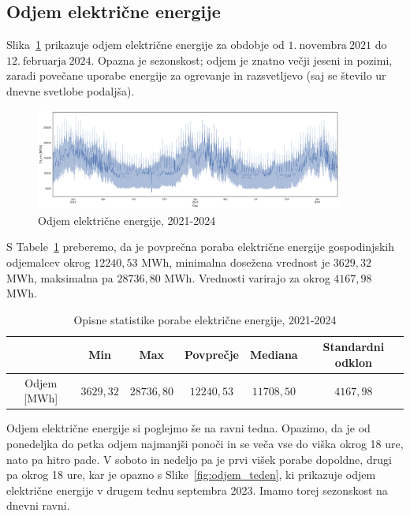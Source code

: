 \documentclass[a4paper, 11pt]{article}
\begin{document}
\subsection{Odjem električne energije}

\noindent Slika~\ref{fig:odjem_EE} prikazuje odjem električne energije za obdobje od 
$1.~\text{novembra}~2021$ do $12.~\text{februarja}~2024$. 
Opazna je sezonskost; odjem je znatno večji jeseni in pozimi, zaradi povečane uporabe energije za ogrevanje in 
razsvetljevo (saj se število ur dnevne svetlobe podaljša). \\

\begin{figure}[h!]
    \centering
    \caption{Odjem električne energije, 2021-2024}\par\medskip
    \label{fig:odjem_EE}
    \includegraphics[width=0.9\textwidth]{odjem_EE.png}
\end{figure}

\noindent S Tabele~\ref{Tab:opisne_statistike} preberemo, da je povprečna poraba električne energije gospodinjskih odjemalcev
okrog $12240{,}53 $ MWh, minimalna dosežena vrednost je $3629{,}32$ MWh, maksimalna pa $28736{,}80$ MWh. Vrednosti varirajo
za okrog $4167{,}98$ MWh. \\

\begin{table}[!h]
    \centering
    \caption{Opisne statistike porabe električne energije, 2021-2024}\par\medskip
    \label{Tab:opisne_statistike}
    \begin{tabular}{c||c|c|c|c|c}
              & Min & Max & Povprečje & Mediana & Standardni odklon \\ \hline \hline
        Odjem [MWh] & $3629{,}32$ & $28736{,}80$ & $12240{,}53$ & $11708{,}50$ & $4167{,}98$ \\ 
    \end{tabular}
\end{table}

\noindent Odjem električne energije si poglejmo še na ravni tedna. Opazimo, da 
je od ponedeljka do petka odjem najmanjši ponoči in se veča vse do viška okrog 18 ure, nato pa hitro pade. 
V soboto in nedeljo pa je prvi višek porabe dopoldne, drugi pa okrog 18 ure, kar je opazno s Slike~\ref{fig:odjem_teden}, 
ki prikazuje odjem 
električne energije v drugem tednu septembra 2023. 
Imamo torej sezonskost na dnevni ravni.
\end{document}
